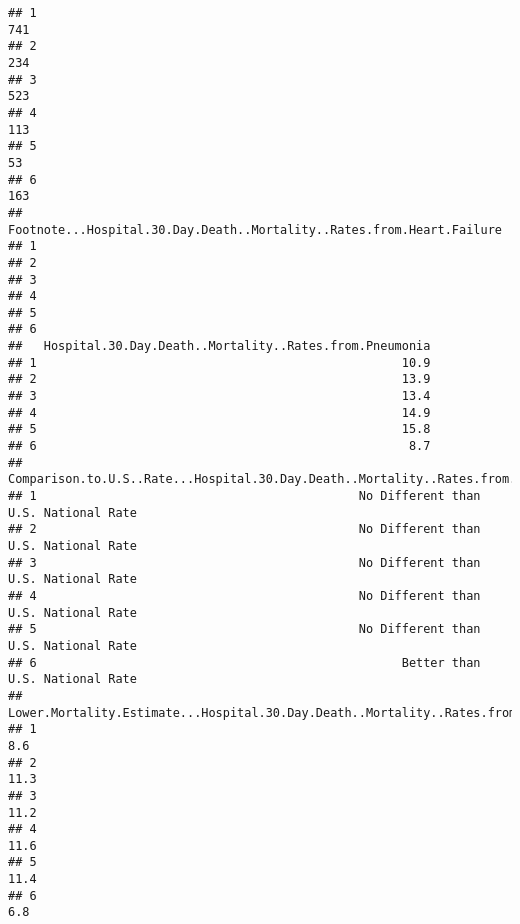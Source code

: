 \documentclass[
]{article}
\begin{document}
\begin{verbatim}
## 1                                                                             741
## 2                                                                             234
## 3                                                                             523
## 4                                                                             113
## 5                                                                              53
## 6                                                                             163
##   Footnote...Hospital.30.Day.Death..Mortality..Rates.from.Heart.Failure
## 1                                                                      
## 2                                                                      
## 3                                                                      
## 4                                                                      
## 5                                                                      
## 6                                                                      
##   Hospital.30.Day.Death..Mortality..Rates.from.Pneumonia
## 1                                                   10.9
## 2                                                   13.9
## 3                                                   13.4
## 4                                                   14.9
## 5                                                   15.8
## 6                                                    8.7
##   Comparison.to.U.S..Rate...Hospital.30.Day.Death..Mortality..Rates.from.Pneumonia
## 1                                             No Different than U.S. National Rate
## 2                                             No Different than U.S. National Rate
## 3                                             No Different than U.S. National Rate
## 4                                             No Different than U.S. National Rate
## 5                                             No Different than U.S. National Rate
## 6                                                   Better than U.S. National Rate
##   Lower.Mortality.Estimate...Hospital.30.Day.Death..Mortality..Rates.from.Pneumonia
## 1                                                                               8.6
## 2                                                                              11.3
## 3                                                                              11.2
## 4                                                                              11.6
## 5                                                                              11.4
## 6                                                                               6.8

\end{verbatim}
\end{document}
